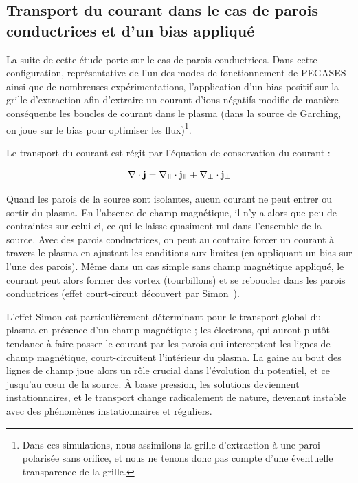 \begin{refsection}
\subsection{Transport du courant dans le cas de parois conductrices et d'un bias
appliqué}

La suite de cette étude porte sur le cas de parois
conductrices. Dans cette configuration, représentative de
l'un des modes de fonctionnement de PEGASES ainsi que de nombreuses
expérimentations, l'application d'un bias positif sur la grille d'extraction afin d'extraire un
courant d'ions négatifs modifie de manière conséquente les boucles de
courant dans le plasma (dans la source de Garching, on joue sur le bias pour
optimiser les flux)\footnote{Dans ces simulations, nous assimilons la grille
d'extraction à une paroi polarisée sans orifice, et nous ne tenons donc pas
compte d'une éventuelle transparence de la grille.}.

Le transport du courant est régit par l'équation de
conservation du courant :

\begin{equation}
\nabla\cdot\mathbf j=\nabla_\para\cdot \mathbf j_\para +\nabla_\perp\cdot
\mathbf j_\perp
\end{equation}

Quand les parois de la source sont
isolantes, aucun courant ne peut entrer ou sortir du plasma. En l'absence de
champ magnétique, il n'y a alors que peu de contraintes sur celui-ci, ce qui le
laisse quasiment nul dans l'ensemble de la source. Avec des parois conductrices,
on peut au contraire forcer un courant à travers le plasma en ajustant les
conditions aux limites (en appliquant un bias sur l'une des parois).
Même dans un cas simple sans champ magnétique appliqué, le courant peut alors
former des vortex (tourbillons) et se reboucler dans les parois
conductrices (effet court-circuit découvert par Simon~\parencite{Simon55}).

L'effet Simon est particulièrement déterminant pour le transport
global du plasma en présence d'un champ magnétique ; les électrons, qui auront plutôt
tendance à faire passer le courant par les parois qui
interceptent les lignes de champ magnétique, court-circuitent l'intérieur du
plasma. La gaine au bout des lignes de champ joue alors un rôle crucial dans
l'évolution du potentiel, et ce jusqu'au c\oe{}ur de la source. À basse
pression, les solutions deviennent instationnaires, et le transport change
radicalement de nature, devenant instable avec des phénomènes instationnaires
et réguliers.
	

\end{refsection}
